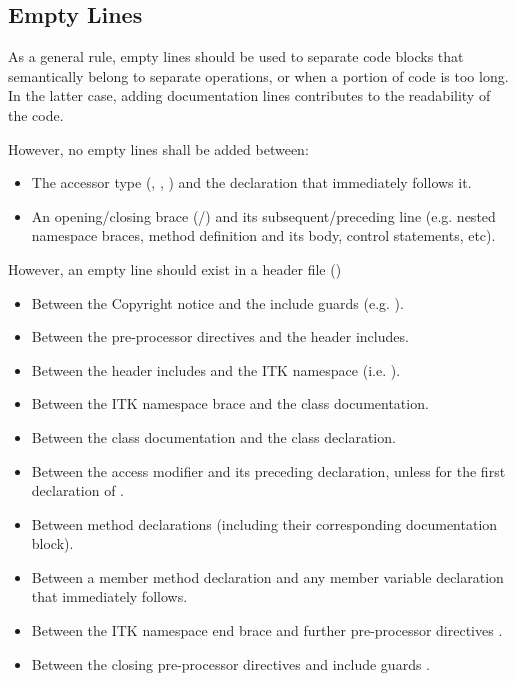 \subsection{Empty Lines}
\label{subsec:EmptyLines}

As a general rule, empty lines should be used to separate code blocks that
semantically belong to separate operations, or when a portion of code is
too long. In the latter case, adding documentation lines contributes to the
readability of the code.

However, no empty lines shall be added between:
\begin{itemize}
\item The accessor type (, , ) and
the declaration that immediately follows it.
\item An opening/closing brace (\code{\{}/\code{\}}) and its
subsequent/preceding line (e.g. nested namespace braces, method definition and
its body, control statements, etc).
\end{itemize}

However, an empty line should exist in a header file ()
\begin{itemize}
\item Between the Copyright notice and the include guards (e.g.
).
\item Between the pre-processor directives and the header includes.
\item Between the header includes and the ITK namespace (i.e.
).
\item Between the ITK namespace brace and the class documentation.
\item Between the class documentation and the class declaration.
\item Between the access modifier and its preceding declaration, unless for the
first declaration of .
\item Between method declarations (including their corresponding documentation
block).
\item Between a member method declaration and any member variable declaration
that immediately follows.
\item Between the ITK namespace end brace  and
further pre-processor directives .
\item Between the closing pre-processor directives and include guards .
\end{itemize}

